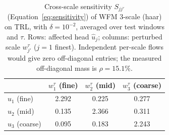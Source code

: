 \begin{table}[ht]
  \centering
  \caption{Cross-scale sensitivity $S_{jj'}$ (Equation~\ref{eq:sensitivity}) of WFM 3-scale (haar) on TRL, with $\delta = 10^{-2}$, averaged over test windows and $\tau$. Rows: affected head $\hat{u}_j$; columns: perturbed scale $w^{\tau}_{j'}$ ($j=1$ finest). Independent per-scale flows would give zero off-diagonal entries; the measured off-diagonal mass is $\rho = 15.1\%$.}
  \label{tab:sensitivity}
  \begin{tabular}{lccc}
    \toprule
    & $w^{\tau}_1$ (fine) & $w^{\tau}_2$ (mid) & $w^{\tau}_3$ (coarse) \\
    \midrule
    $\hat{u}_1$ (fine) & 2.292 & 0.225 & 0.277 \\
    $\hat{u}_2$ (mid) & 0.135 & 2.366 & 0.311 \\
    $\hat{u}_3$ (coarse) & 0.095 & 0.183 & 2.243 \\
    \bottomrule
  \end{tabular}
\end{table}
